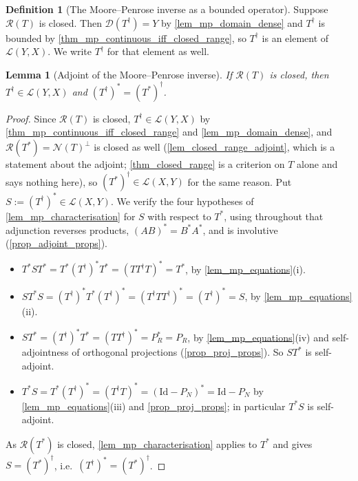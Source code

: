 \documentclass[a4paper]{report}
\theoremstyle{plain}
\newtheorem{lemma}[theorem]{Lemma}
\theoremstyle{definition}
\newtheorem{definition}[theorem]{Definition}
\theoremstyle{remark}
\newcommand{\Ll}{\mathcal{L}}
\newcommand{\Ran}{\mathcal{R}}
\newcommand{\Ker}{\mathcal{N}}
\newcommand{\Dom}{\mathcal{D}}
\newcommand{\Id}{\mathrm{Id}}
\newcommand{\dg}{^{\dagger}}
\begin{document}
\begin{definition}[The Moore--Penrose inverse as a bounded operator]
  \label{def_moore_penrose_bounded}
  Suppose $\Ran(T)$ is closed.  Then $\Dom(T\dg) = Y$ by \cref{lem_mp_domain_dense} and
  $T\dg$ is bounded by \cref{thm_mp_continuous_iff_closed_range}, so $T\dg$ is an element
  of $\Ll(Y,X)$.  We write $T\dg$ for that element as well.
\end{definition}


\begin{lemma}[Adjoint of the Moore--Penrose inverse]
  \label{lem_mp_adjoint}
  If $\Ran(T)$ is closed, then $T\dg \in \Ll(Y,X)$ and $(T\dg)^{*} = (T^{*})\dg$.
\end{lemma}

\begin{proof}
  Since $\Ran(T)$ is closed, $T\dg \in \Ll(Y,X)$ by
  \cref{thm_mp_continuous_iff_closed_range} and \cref{lem_mp_domain_dense}, and
  $\Ran(T^{*}) = \Ker(T)^{\perp}$ is closed as well (\cref{lem_closed_range_adjoint}, which
  is a statement about the adjoint; \cref{thm_closed_range} is a criterion on $T$ alone and
  says nothing here), so $(T^{*})\dg \in \Ll(X,Y)$ for the same reason.  Put
  $S := (T\dg)^{*} \in \Ll(X,Y)$.  We verify the four hypotheses of
  \cref{lem_mp_characterisation} for $S$ with respect to $T^{*}$, using throughout that
  adjunction reverses products, $(AB)^{*} = B^{*}A^{*}$, and is involutive
  (\cref{prop_adjoint_props}).
  \begin{itemize}
    \item $T^{*}ST^{*} = T^{*}(T\dg)^{*}T^{*} = (TT\dg T)^{*} = T^{*}$, by
      \cref{lem_mp_equations}(i).
    \item $ST^{*}S = (T\dg)^{*}T^{*}(T\dg)^{*} = (T\dg TT\dg)^{*} = (T\dg)^{*} = S$, by
      \cref{lem_mp_equations}(ii).
    \item $ST^{*} = (T\dg)^{*}T^{*} = (TT\dg)^{*} = P_R^{*} = P_R$,
      by \cref{lem_mp_equations}(iv) and self-adjointness of
      orthogonal projections (\cref{prop_proj_props}).  So $ST^{*}$ is
      self-adjoint.
    \item $T^{*}S = T^{*}(T\dg)^{*} = (T\dg T)^{*} = (\Id - P_N)^{*} = \Id - P_N$
      by \cref{lem_mp_equations}(iii) and \cref{prop_proj_props}; in particular
      $T^{*}S$ is self-adjoint.
  \end{itemize}
  As $\Ran(T^{*})$ is closed, \cref{lem_mp_characterisation} applies to $T^{*}$ and gives
  $S = (T^{*})\dg$, i.e.\ $(T\dg)^{*} = (T^{*})\dg$.
\end{proof}
\end{document}
